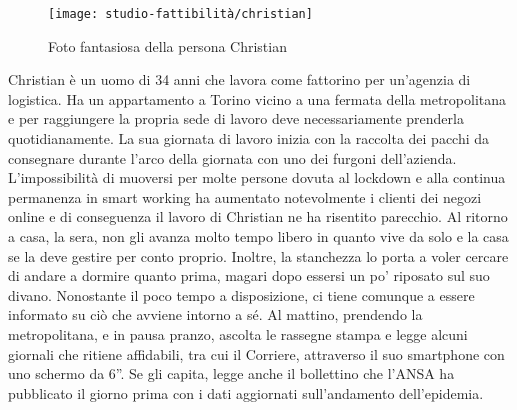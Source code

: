 \begin{wrapfigure}{l}{8cm}
    \texttt{[image: studio-fattibilità/christian]}
    \caption{Foto fantasiosa della persona Christian}
\end{wrapfigure}

Christian è un uomo di 34 anni che lavora come fattorino per un'agenzia di logistica.
Ha un appartamento a Torino vicino a una fermata della metropolitana e per raggiungere la propria sede di lavoro deve necessariamente prenderla quotidianamente. La sua giornata di lavoro inizia con la raccolta dei pacchi da consegnare durante l'arco della giornata con uno dei furgoni dell'azienda. L'impossibilità di muoversi per molte persone dovuta al lockdown e alla continua permanenza in smart working ha aumentato notevolmente i clienti dei negozi online e di conseguenza il lavoro di Christian ne ha risentito parecchio. Al ritorno a casa, la sera, non gli avanza molto tempo libero in quanto vive da solo e la casa se la deve gestire per conto proprio. Inoltre, la stanchezza lo porta a voler cercare di andare a dormire quanto prima, magari dopo essersi un po' riposato sul suo divano.
Nonostante il poco tempo a disposizione, ci tiene comunque a essere informato su ciò che avviene intorno a sé. Al mattino, prendendo la metropolitana, e in pausa pranzo, ascolta le rassegne stampa e legge alcuni giornali che ritiene affidabili, tra cui il Corriere, attraverso il suo smartphone con uno schermo da 6''. Se gli capita, legge anche il bollettino che l'ANSA ha pubblicato il giorno prima con i dati aggiornati sull'andamento dell'epidemia.


